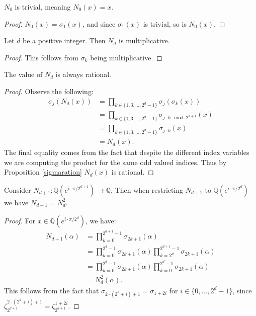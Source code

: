 \documentclass[12pt]{dalthesis}
\begin{document}
\begin{proposition}
$N_0$ is trivial, meaning $N_0(x) = x$.
\end{proposition}
\begin{proof}
$N_0 (x) = \sigma_1 (x)$, and since $\sigma_1 (x)$ is trivial, so is $N_0 (x)$.
\end{proof}

\begin{proposition}
Let $d$ be a positive integer. Then $N_d$ is multiplicative.
\end{proposition}
\begin{proof}
This follows from $\sigma_k$ being multiplicative.
\end{proof}

\begin{proposition}
\label{N_dRation}
The value of $N_d$ is always rational.
\end{proposition}
\begin{proof}
Observe the following:
\begin{equation*}
\begin{split}
\sigma_j (N_d(x)) & = \prod\limits_{k \in \{1, 3, \dots , 2^d-1\}} \sigma_j (\sigma_k (x)) \\
& = \prod\limits_{k \in \{1, 3, \dots , 2^d-1\}} \sigma_{j\cdot k \mod 2^{d+1}} (x) \\
& = \prod\limits_{k \in \{1, 3, \dots , 2^d-1\}} \sigma_{j\cdot k} (x) \\
& = N_d(x).
\end{split}
\end{equation*}
The final equality comes from the fact that despite the different index variables we are computing the product for the same odd valued indices. Thus by Proposition \ref{sigmaration} $N_d(x)$ is rational.
\end{proof}

\begin{proposition}
Consider $N_{d+1}: \mathbb{Q}(e^{i\cdot \pi / 2^{d+1}}) \longrightarrow \mathbb{Q}$. Then when restricting $N_{d+1}$ to $\mathbb{Q}(e^{i\cdot \pi / 2^{d}})$ we have $N_{d+1} = N_d^2$.
\end{proposition}
\begin{proof}
For $x \in \mathbb{Q}(e^{i\cdot \pi / 2^{d}})$, we have:
\begin{equation*}
\begin{split}
N_{d+1}(\alpha) & = \prod_{k=0}^{2^{d+1} - 1} \sigma_{2k+1} (\alpha) \\
& = \prod_{k=0}^{2^{d} - 1} \sigma_{2k+1} (\alpha) \prod_{k=2^{d}}^{2^{d+1} - 1} \sigma_{2k+1} (\alpha) \\
& = \prod_{k=0}^{2^{d} - 1} \sigma_{2k+1} (\alpha) \prod_{k=0}^{2^{d} - 1} \sigma_{2k+1} (\alpha) \\
& = N_d^2 (\alpha).
\end{split}
\end{equation*}
This follows from the fact that $\sigma_{2\cdot (2^d+i) + 1} = \sigma_{1+2i}$ for $i \in \{0, ..., 2^d - 1\}$, since $\zeta_{2^{d+1}}^{2\cdot (2^d+i) + 1} = \zeta_{2^{d+1}}^{1+2i}$.
\end{proof}
\end{document}
